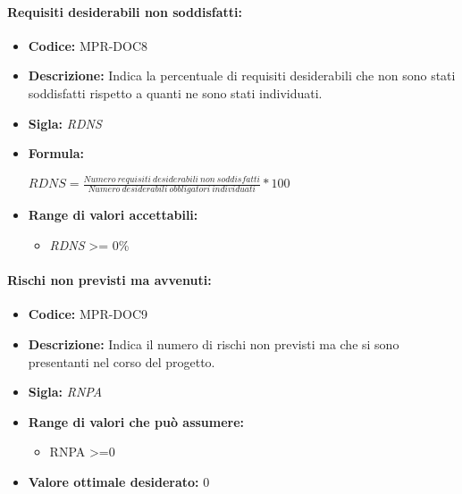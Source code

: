 \paragraph{Requisiti desiderabili non soddisfatti:}
\begin{itemize}
  \item \textbf{Codice:} MPR-DOC8
  \item \textbf{Descrizione:} Indica la percentuale di requisiti desiderabili che non sono stati  soddisfatti rispetto a quanti ne sono stati individuati.
  \item \textbf{Sigla:} \textit{RDNS}
  \item \textbf{Formula:}
  \begin{center}
    \(RDNS=\frac{Numero\ requisiti\ desiderabili\ non\ soddisfatti}{Numero\ desiderabili\  obbligatori\ individuati}*100\)
  \end{center}
  \item \textbf{Range di valori accettabili:}
  \begin{itemize}
      \item \textit{RDNS} >= 0\%
  
  \end{itemize}
\end{itemize}

\paragraph{Rischi non previsti ma avvenuti:}
\begin{itemize}
    \item \textbf{Codice:} MPR-DOC9
    \item \textbf{Descrizione:} Indica il numero di rischi non previsti ma che si sono presentanti nel corso del progetto.
    \item \textbf{Sigla:} \textit{RNPA}
    \item \textbf{Range di valori che può assumere:}
    \begin{itemize}
        \item  RNPA >=0
    \end{itemize}
    \item \textbf{Valore ottimale desiderato:} 0
    

    
\end{itemize}












